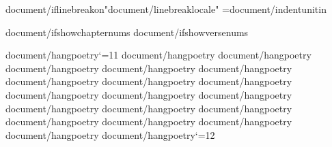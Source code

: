 {document/iflinebreakon}\XeTeXlinebreaklocale "{document/linebreaklocale}"
={document/indentunit}in

{document/ifshowchapternums}\OmitChapterNumbertrue
\def\AfterChapterSpaceFactor{{{texpert/afterchapterspace}}}
{document/ifshowversenums}\def\AfterVerseSpaceFactor{{{texpert/afterversespace}}}

{document/hangpoetry}\catcode`\@=11
{document/hangpoetry}
{document/hangpoetry}
{document/hangpoetry}
{document/hangpoetry}
{document/hangpoetry}
{document/hangpoetry}
{document/hangpoetry}
{document/hangpoetry}
{document/hangpoetry}
{document/hangpoetry}
{document/hangpoetry}
{document/hangpoetry}
{document/hangpoetry}
{document/hangpoetry}
{document/hangpoetry}
{document/hangpoetry}
{document/hangpoetry}
{document/hangpoetry}
{document/hangpoetry}\catcode`\@=12


